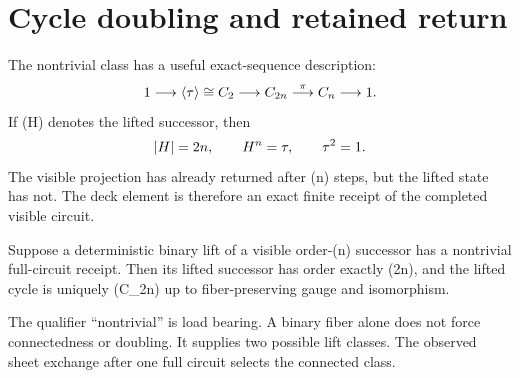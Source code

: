 \section{Cycle doubling and retained return}

The nontrivial class has a useful exact-sequence description:
\[
1\longrightarrow\langle\tau\rangle\cong C_2
\longrightarrow C_{2n}
\overset{\pi}{\longrightarrow}C_n
\longrightarrow1.
\]
If (H) denotes the lifted successor, then
\[
|H|=2n,
\qquad
H^n=\tau,
\qquad
\tau^2=1.
\]
The visible projection has already returned after (n) steps, but the lifted
state has not. The deck element is therefore an exact finite receipt of the
completed visible circuit.

\begin{corollary}
Suppose a deterministic binary lift of a visible order-(n) successor has a
nontrivial full-circuit receipt. Then its lifted successor has order exactly
(2n), and the lifted cycle is uniquely (C_{2n}) up to fiber-preserving
gauge and isomorphism.
\end{corollary}

The qualifier ``nontrivial'' is load bearing. A binary fiber alone does not
force connectedness or doubling. It supplies two possible lift classes. The
observed sheet exchange after one full circuit selects the connected class.

